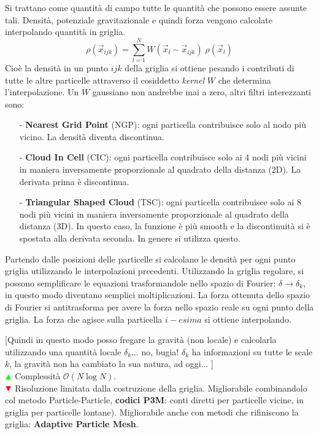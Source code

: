 \begin{example}
 Si trattano come quantità di campo tutte le quantità che possono essere assunte tali. Densità, potenziale gravitazionale e quindi forza vengono calcolate interpolando quantità in griglia. $$ \rho (\vec{x}_{ijk})=\sum_{l=1}^N W(\vec{x}_l - \vec{x}_{ijk}) \; \rho(\vec{x}_l)$$ Cioè la densità in un punto ${ijk}$ della griglia si ottiene pesando i contributi di tutte le altre particelle attraverso il cosiddetto \textit{kernel} $W$ che determina l'interpolazione. Un $W$ gaussiano non andrebbe mai a zero, altri filtri interezzanti sono:
 \begin{itemize}
     \item[-] \textbf{Nearest Grid Point} (NGP): ogni particella contribuisce solo al nodo più vicino. La densità diventa discontinua.
     \item[-] \textbf{Cloud In Cell} (CIC): ogni particella contribuisce solo ai 4 nodi più vicini in maniera inversamente proporzionale al quadrato della distanza (2D). La derivata prima è discontinua.
     \item[-] \textbf{Triangular Shaped Cloud} (TSC): ogni particella contribuisce solo ai 8 nodi più vicini in maniera inversamente proporzionale al quadrato della distanza (3D). In questo caso, la funzione è più smooth e la discontinuità si è spostata alla derivata seconda. In genere si utilizza questo.
 \end{itemize}

 Partendo dalle posizioni delle particelle si calcolano le densità per ogni punto griglia utilizzando le interpolazioni precedenti. Utilizzando la griglia regolare, si possono semplificare le equazioni trasformandole nello spazio di Fourier: $\delta\to \delta_k$, in questo modo diventano semplici moltiplicazioni. La forza ottenuta dello spazio di Fourier si antitrasforma per avere la forza nello spazio reale su ogni punto della griglia. La forza che agisce sulla particella $i-esima$ si ottiene interpolando.

[Quindi in questo modo posso fregare la gravità (non locale) e calcolarla utilizzando una quantità locale $\delta_k$... no, bugia! $\delta_k$ ha informazioni su tutte le scale $k$, la gravità non ha cambiato la sua natura, ad oggi... ]
 \\ ${\color{green} \blacktriangle  }$ Complessità $\mathcal{O} (N\log N)$. 
 \\ ${\color{red} \blacktriangledown } $ Risoluzione limitata dalla costruzione della griglia. Migliorabile combinandolo col metodo Particle-Particle, \textbf{codici P3M}: conti diretti per particelle vicine, in griglia per particelle lontane). Migliorabile anche con metodi che rifiniscono la griglia: \textbf{Adaptive Particle Mesh}.

\end{example}  

